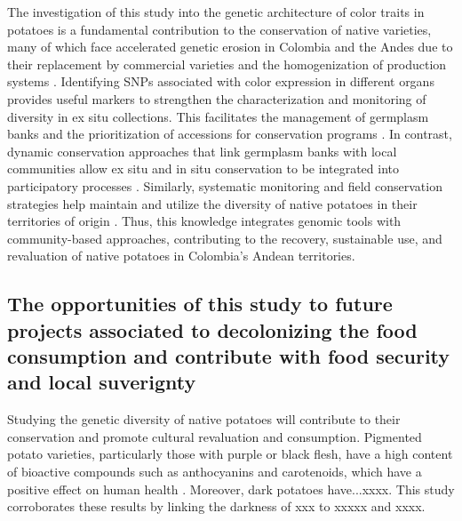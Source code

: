 \documentclass[pdflatex,sn-mathphys-ay]{sn-jnl}%
\begin{document}

The investigation of this study into the genetic architecture of color traits in potatoes is a fundamental contribution to the conservation of native varieties, many of which face accelerated genetic erosion in Colombia and the Andes due to their replacement by commercial varieties and the homogenization of production systems \citep{arcespatial,ellis2018genetic}. Identifying SNPs associated with color expression in different organs provides useful markers to strengthen the characterization and monitoring of diversity in ex situ collections. This facilitates the management of germplasm banks and the prioritization of accessions for conservation programs \citep{ellis2018genetic}. In contrast, dynamic conservation approaches that link germplasm banks with local communities allow ex situ and in situ conservation to be integrated into participatory processes \citep{luttringhaus2021dynamic}. Similarly, systematic monitoring and field conservation strategies help maintain and utilize the diversity of native potatoes in their territories of origin \citep{arcespatial,dawson2023identifying}. Thus, this knowledge integrates genomic tools with community-based approaches, contributing to the recovery, sustainable use, and revaluation of native potatoes in Colombia's Andean territories.



\subsection {The opportunities of this study to future projects associated to decolonizing the food consumption and contribute with food security and local suverignty}


Studying the genetic diversity of native potatoes will contribute to their conservation and promote cultural revaluation and consumption. Pigmented potato varieties, particularly those with purple or black flesh, have a high content of bioactive compounds such as anthocyanins and carotenoids, which have a positive effect on human health \citep{burgos2020potato,vollmer2022world}. Moreover, dark potatoes have...xxxx. This study corroborates these results by linking the darkness of xxx to xxxxx and xxxx.
\end{document}
